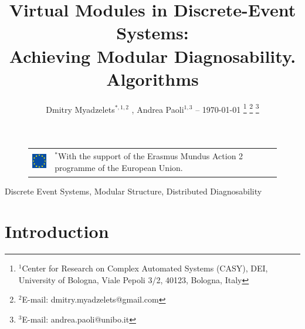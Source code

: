 \documentclass[a4paper, 10pt, conference]{ieeeconf}
\begin{document}
\title{Virtual Modules in Discrete-Event Systems: \\
Achieving Modular Diagnosability. Algorithms} 
\author{
	Dmitry Myadzelets$^{*,1,2}$
	, Andrea Paoli$^{1,3}$
	-- \today
	\thanks{$^{1}$Center for Research on Complex Automated Systems (CASY), DEI,
	University of Bologna, Viale Pepoli 3/2, 40123, Bologna, Italy}
		\thanks{$^{2}$E-mail: {dmitry.myadzelets@gmail.com}}
		\thanks{$^{3}$E-mail: {andrea.paoli@unibo.it}}
}
\maketitle

\begin{figure}[!b]
\begin{tabular}{l p{60mm}}
 	\includegraphics[height=10mm]{EU_flag.eps}
 	& \vspace{-10mm} \footnotesize
 	$^{*}$With the support of the Erasmus Mundus Action 2 programme of the
 	European Union.
\end{tabular}
\end{figure}

\begin{abstract}

\end{abstract}

\begin{keywords}
Discrete Event Systems, Modular Structure, Distributed Diagnosability
\end{keywords}

\newtheorem{theorem}{Theorem}
\newtheorem{definition}{Definition}
\newtheorem{lemma}{Lemma}
\newtheorem{assumption}{Assumption}
\newtheorem{corollary}{Corollary}
\newtheorem{example}{Example}
\newtheorem{algorithm}{Algorithm}


\section{Introduction}
\end{document}

